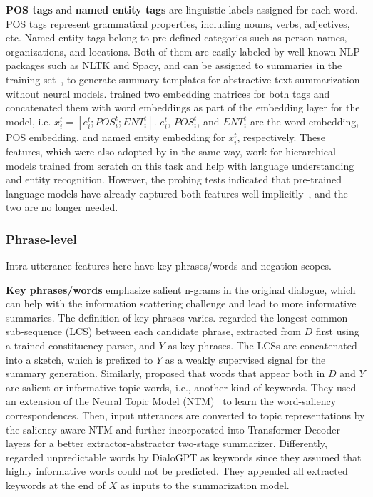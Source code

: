 \textbf{POS tags} and \textbf{named entity tags} are linguistic labels assigned for each word. POS tags represent grammatical properties, including nouns, verbs, adjectives, etc. Named entity tags belong to pre-defined categories such as person names, organizations, and locations. Both of them are easily labeled by well-known NLP packages such as NLTK and Spacy, 
and can be assigned to summaries in the training set~\cite{OyaMCN14,singla2017spoken}, to generate summary templates for abstractive text summarization without neural models. 
\citet{zhu2020end} trained two embedding matrices for both tags and concatenated them with word embeddings as part of the embedding layer for the model, i.e.
$x_i^t = [e_i^t;POS_i^t;ENT_i^t]$. 
$e_i^t$, $POS_i^t$, and $ENT_i^t$ are the word embedding, POS embedding, and named entity embedding for $x_i^t$, respectively. These features, which were also adopted by \citet{qi2021improving} in the same way, work for hierarchical models trained from scratch on this task and 
help with language understanding and entity recognition. 
However, the probing tests indicated that pre-trained 
language models have already captured both features well 
implicitly~\cite{tenney2018you}, and the two are no longer 
needed. 

\subsubsection{Phrase-level}
Intra-utterance features here have key phrases/words and negation scopes.
 
\textbf{Key phrases/words} emphasize salient 
n-grams in the original dialogue, which can help with the information scattering challenge and lead to more informative summaries. 
The definition of key phrases varies.
\citet{wu2021controllable} regarded the longest common sub-sequence (LCS) between each candidate phrase, extracted from $D$ first using a trained constituency parser, and $Y$ as key phrases. 
The LCSs are concatenated into a sketch, 
which is prefixed to $Y$ as a weakly 
supervised signal for the summary generation. 
Similarly, \citet{zou2021topic} proposed that words that appear both 
in $D$ and $Y$ are salient or informative topic words, i.e., another kind of keywords. 
They used an extension of the Neural Topic Model (NTM)~\cite{miao2017discovering} to learn the word-saliency correspondences. 
Then, input utterances are converted to topic representations by the saliency-aware NTM and further incorporated into Transformer Decoder layers for a better extractor-abstractor two-stage summarizer.
Differently, \citet{feng2021language} regarded unpredictable words by DialoGPT as keywords since they assumed that highly informative words could not be predicted. 
They appended all extracted keywords at the end of $X$ as inputs to the summarization model. 



